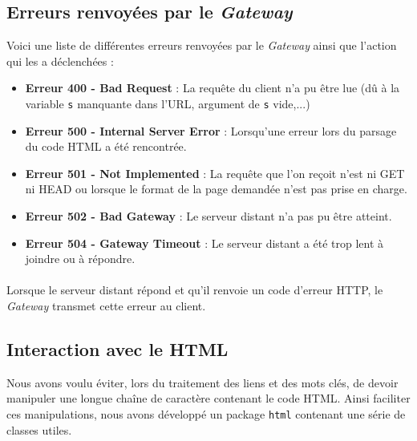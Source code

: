 \documentclass[a4paper,11pt]{article}
\begin{document}
	\subsection{Erreurs renvoyées par le \textit{Gateway}}
Voici une liste de différentes erreurs renvoyées par le \textit{Gateway} ainsi que l'action qui les a déclenchées : 
\begin{itemize}
	\setlength{\itemsep}{6pt}
	\item \textbf{Erreur 400 - Bad Request} : La requête du client n'a pu être lue (dû à la variable \texttt{s} manquante dans l'URL, argument de \texttt{s} vide,...)
	\item \textbf{Erreur 500 - Internal Server Error} : Lorsqu'une erreur lors du parsage du code HTML a été rencontrée.
	\item \textbf{Erreur 501 - Not Implemented} : La requête que l'on reçoit n'est ni GET ni HEAD ou lorsque le format de la page demandée n'est pas prise en charge.
	\item \textbf{Erreur 502 - Bad Gateway} : Le serveur distant n'a pas pu être atteint.
	\item \textbf{Erreur 504 - Gateway Timeout} : Le serveur distant a été trop lent à joindre ou à répondre.
\end{itemize}
\paragraph{}
Lorsque le serveur distant répond et qu'il renvoie un code d'erreur HTTP, le \textit{Gateway} transmet cette erreur au client.
\subsection{Interaction avec le HTML}
Nous avons voulu éviter, lors du traitement des liens et des mots clés, de devoir manipuler une longue chaîne de caractère contenant le code HTML. Ainsi faciliter ces manipulations, nous avons développé un package \texttt{html} contenant une série de classes utiles. 
\end{document}
